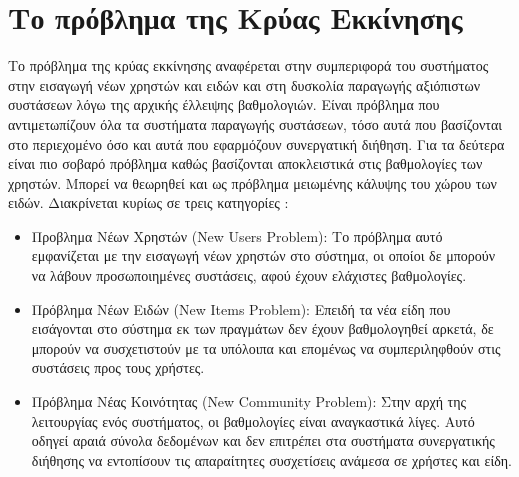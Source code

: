 \section{Το πρόβλημα της Κρύας Εκκίνησης} 
Το πρόβλημα της κρύας εκκίνησης αναφέρεται στην συμπεριφορά του συστήματος στην εισαγωγή νέων χρηστών και ειδών και στη δυσκολία παραγωγής αξιόπιστων συστάσεων λόγω της αρχικής έλλειψης βαθμολογιών. Είναι πρόβλημα που αντιμετωπίζουν όλα τα συστήματα παραγωγής συστάσεων, τόσο αυτά που βασίζονται στο περιεχομένο όσο και αυτά που εφαρμόζουν συνεργατική διήθηση. Για τα δεύτερα είναι πιο σοβαρό πρόβλημα καθώς βασίζονται αποκλειστικά στις βαθμολογίες των χρηστών. Μπορεί να θεωρηθεί και ως πρόβλημα μειωμένης κάλυψης του χώρου των ειδών.\cite{ricci2011recommender} Διακρίνεται κυρίως σε τρεις κατηγορίες \cite{Nikolakopoulos2015126}: 
\begin{itemize}
\item Προβλημα Νέων Χρηστών ({\en New Users Problem}): Το πρόβλημα αυτό εμφανίζεται με την εισαγωγή νέων χρηστών στο σύστημα, οι οποίοι δε μπορούν να λάβουν προσωποιημένες συστάσεις, αφού έχουν ελάχιστες βαθμολογίες.
\item Πρόβλημα Νέων Ειδών ({\en New Items Problem}): Επειδή τα νέα είδη που εισάγονται στο σύστημα εκ των πραγμάτων δεν έχουν βαθμολογηθεί αρκετά, δε μπορούν να συσχετιστούν με τα υπόλοιπα και επομένως να συμπεριληφθούν στις συστάσεις προς τους χρήστες. 
\item Πρόβλημα Νέας Κοινότητας ({\en New Community Problem}): Στην αρχή της λειτουργίας ενός συστήματος, οι βαθμολογίες είναι αναγκαστικά λίγες. Αυτό οδηγεί αραιά σύνολα δεδομένων και δεν επιτρέπει στα συστήματα συνεργατικής διήθησης να εντοπίσουν τις απαραίτητες συσχετίσεις ανάμεσα σε χρήστες και είδη.
\end{itemize}\par
